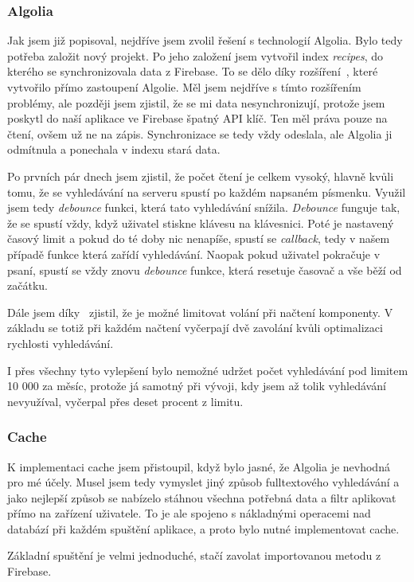 \subsubsection{Algolia}
Jak jsem již popisoval, nejdříve jsem zvolil řešení s technologií Algolia. Bylo tedy potřeba založit nový projekt. Po jeho založení
jsem vytvořil index \emph{recipes}, do kterého se synchronizovala data z Firebase. To se dělo díky rozšíření~\cite{AlgoliaExtension}, které vytvořilo přímo
zastoupení Algolie. Měl jsem nejdříve s tímto rozšířením problémy, ale později jsem zjistil, že se mi data nesynchronizují, protože jsem
poskytl do naší aplikace ve Firebase špatný API klíč. Ten měl práva pouze na čtení, ovšem už ne na zápis. Synchronizace se tedy vždy odeslala,
ale Algolia ji odmítnula a ponechala v indexu stará data.

Po prvních pár dnech jsem zjistil, že počet čtení je celkem vysoký, hlavně kvůli tomu, že se vyhledávání na serveru spustí po
každém napsaném písmenku. Využil jsem tedy \emph{debounce} funkci, která tato vyhledávání snížila. \emph{Debounce} funguje tak,
že se spustí vždy, když uživatel stiskne klávesu na klávesnici. Poté je nastavený časový limit a pokud do té doby nic nenapíše,
spustí se \emph{callback}, tedy v našem případě funkce která zařídí vyhledávání. Naopak pokud uživatel pokračuje v psaní, spustí
se vždy znovu \emph{debounce} funkce, která resetuje časovač a vše běží od začátku.

Dále jsem díky~\cite{AlgoliaBlog} zjistil, že je možné limitovat volání při načtení komponenty. V základu se totiž při každém
načtení vyčerpají dvě zavolání kvůli optimalizaci rychlosti vyhledávání.

I přes všechny tyto vylepšení bylo nemožné udržet počet vyhledávání pod limitem 10 000 za měsíc, protože já samotný při vývoji,
kdy jsem až tolik vyhledávání nevyužíval, vyčerpal přes deset procent z limitu.

\subsubsection{Cache}
K implementaci cache jsem přistoupil, když bylo jasné, že Algolia je nevhodná pro mé účely. Musel jsem tedy vymyslet jiný způsob fulltextového
vyhledávání a jako nejlepší způsob se nabízelo stáhnou všechna potřebná data a filtr aplikovat přímo na zařízení uživatele. To je ale
spojeno s nákladnými operacemi nad databází při každém spuštění aplikace, a proto bylo nutné implementovat cache.

Základní spuštění je velmi jednoduché, stačí zavolat importovanou metodu z Firebase.

